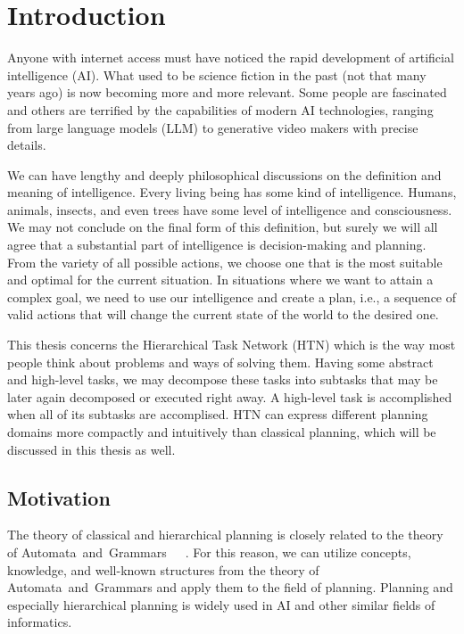 \chapter*{Introduction}

\noindent
Anyone with internet access must have noticed the rapid development of artificial intelligence (AI). What used to be science fiction in the past (not that many years ago) is now becoming more and more relevant. Some people are fascinated and others are terrified by the capabilities of modern AI technologies, ranging from large language models (LLM) to generative video makers with precise details.

\medskip\noindent
We can have lengthy and deeply philosophical discussions on the definition and meaning of intelligence. Every living being has some kind of intelligence. Humans, animals, insects, and even trees have some level of intelligence and consciousness. We may not conclude on the final form of this definition, but surely we will all agree that a substantial part of intelligence is decision-making and planning. From the variety of all possible actions, we choose one that is the most suitable and optimal for the current situation. In situations where we want to attain a complex goal, we need to use our intelligence and create a plan, i.e., a sequence of valid actions that will change the current state of the world to the desired one.

\medskip\noindent
This thesis concerns the Hierarchical Task Network (HTN) which is the way most people think about problems and ways of solving them. Having some abstract and high-level tasks, we may decompose these tasks into subtasks that may be later again decomposed or executed right away. A high-level task is accomplished when all of its subtasks are accomplised. HTN can express different planning domains more compactly and intuitively than classical planning, which will be discussed in this thesis as well.

\section*{Motivation}

\noindent
The theory of classical and hierarchical planning is closely related to the theory of Automata~and~Grammars~\cite{complexity}~\cite{langclassification}~\cite{cmyk}. For this reason, we can utilize concepts, knowledge, and well-known structures from the theory of Automata~and~Grammars and apply them to the field of planning. Planning and especially hierarchical planning is widely used in AI and other similar fields of informatics.

